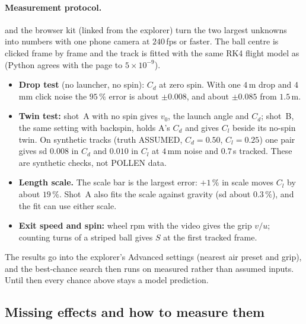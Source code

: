 \paragraph{Measurement protocol.}  and the browser kit 
(linked from the explorer) turn the two largest unknowns into numbers with one phone camera at
$240$\,fps or faster. The ball centre is clicked frame by frame and the track is fitted with the same RK4
flight model as  (Python  agrees with the page to $5\times10^{-9}$).
\begin{itemize}
  \item \textbf{Drop test} (no launcher, no spin): $C_d$ at zero spin. With one $4$\,m drop and $4$\,mm click
    noise the $95\,\%$ error is about $\pm0.008$, and about $\pm0.085$ from $1.5$\,m\derived.
  \item \textbf{Twin test:} shot~A with no spin gives $v_0$, the launch angle and $C_d$; shot~B, the same
    setting with backspin, holds A's $C_d$ and gives $C_l$ beside its no-spin twin. On synthetic
     tracks (truth ASSUMED, $C_d=0.50$, $C_l=0.25$) one pair gives sd $0.008$ in $C_d$ and
    $0.010$ in $C_l$ at $4$\,mm noise and $0.7$\,s tracked\derived. These are synthetic checks, not POLLEN data.
  \item \textbf{Length scale.} The scale bar is the largest error: $+1\,\%$ in scale moves $C_l$ by about
    $19\,\%$\derived. Shot~A also fits the scale against gravity (sd about $0.3\,\%$\derived), and the fit can
    use either scale.
  \item \textbf{Exit speed and spin:} wheel rpm with the video gives the grip $v/u$; counting turns of a
    striped ball gives $S$ at the first tracked frame.
\end{itemize}
The results go into the explorer's Advanced settings (nearest air preset and grip), and the best-chance search
then runs on measured rather than assumed inputs. Until then every chance above stays a model prediction.

\subsection{Missing effects and how to measure them}
\label{sec:field-missing}

